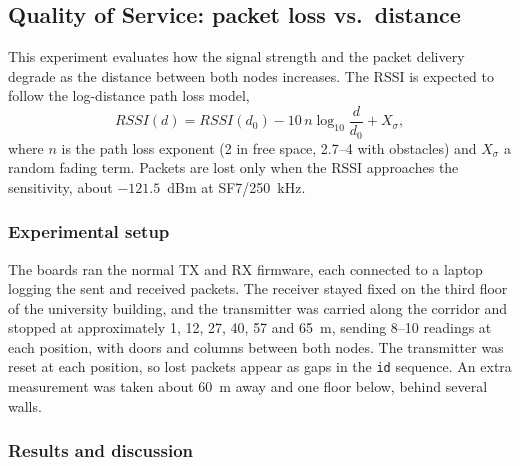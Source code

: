\documentclass[informe,english]{plantilla}
\begin{document}
\subsection{Quality of Service: packet loss vs.\ distance}
\label{sec:exp-qos}

This experiment evaluates how the signal strength and the packet delivery degrade as the distance between both nodes increases. The RSSI is expected to follow the log-distance path loss model,
\begin{equation}
    RSSI(d) = RSSI(d_0) - 10\,n\log_{10}\frac{d}{d_0} + X_\sigma,
    \label{eq:pathloss}
\end{equation}
where $n$ is the path loss exponent (2 in free space, 2.7--4 with obstacles) and $X_\sigma$ a random fading term. Packets are lost only when the RSSI approaches the sensitivity, about $-121.5$~dBm at SF7/250~kHz.

\subsubsection{Experimental setup}

The boards ran the normal TX and RX firmware, each connected to a laptop logging the sent and received packets. The receiver stayed fixed on the third floor of the university building, and the transmitter was carried along the corridor and stopped at approximately 1, 12, 27, 40, 57 and 65~m, sending 8--10 readings at each position, with doors and columns between both nodes. The transmitter was reset at each position, so lost packets appear as gaps in the \texttt{id} sequence. An extra measurement was taken about 60~m away and one floor below, behind several walls.

\subsubsection{Results and discussion}
\end{document}
